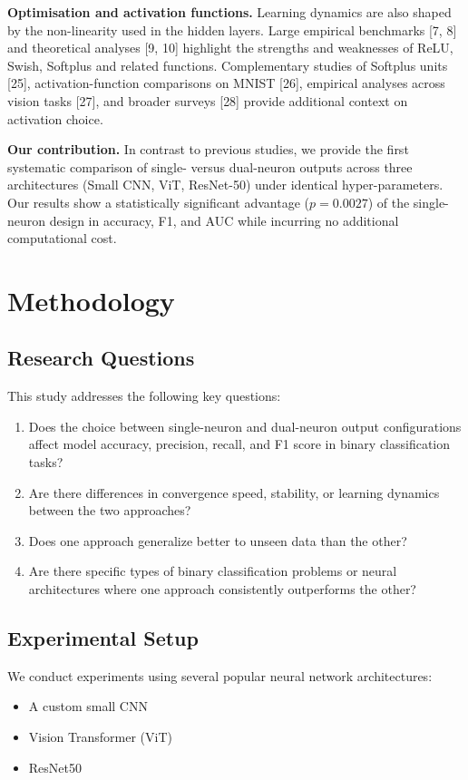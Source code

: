 \documentclass[11pt]{article}
\begin{document}
\textbf{Optimisation and activation functions.} Learning dynamics are also shaped by the non-linearity used in the hidden layers. Large empirical benchmarks [7, 8] and theoretical analyses [9, 10] highlight the strengths and weaknesses of ReLU, Swish, Softplus and related functions. Complementary studies of Softplus units [25], activation-function comparisons on MNIST [26], empirical analyses across vision tasks [27], and broader surveys [28] provide additional context on activation choice.

\textbf{Our contribution.} In contrast to previous studies, we provide the first systematic comparison of single- versus dual-neuron outputs across three architectures (Small CNN, ViT, ResNet-50) under identical hyper-parameters. Our results show a statistically significant advantage ($p = 0.0027$) of the single-neuron design in accuracy, F1, and AUC while incurring no additional computational cost.

\section{Methodology}
\subsection{Research Questions}
This study addresses the following key questions:
\begin{enumerate}
\item Does the choice between single-neuron and dual-neuron output configurations affect model accuracy, precision, recall, and F1 score in binary classification tasks?
\item Are there differences in convergence speed, stability, or learning dynamics between the two approaches?
\item Does one approach generalize better to unseen data than the other?
\item Are there specific types of binary classification problems or neural architectures where one approach consistently outperforms the other?
\end{enumerate}

\subsection{Experimental Setup}
We conduct experiments using several popular neural network architectures:
\begin{itemize}
\item A custom small CNN
\item Vision Transformer (ViT)
\item ResNet50
\end{itemize}
\end{document}

